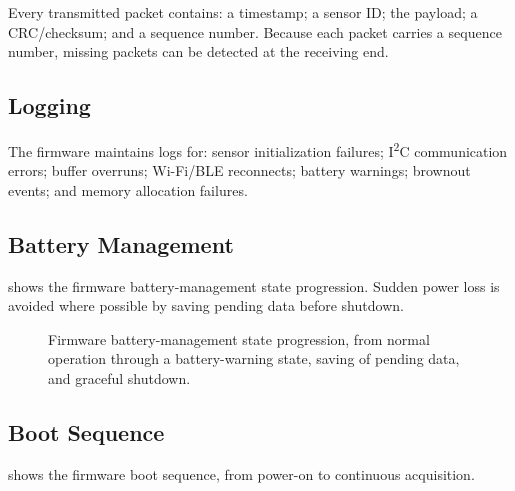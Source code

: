 Every transmitted packet contains: a timestamp; a sensor ID; the payload; a CRC/checksum; and a sequence number. Because each packet carries a sequence number, missing packets can be detected at the receiving end.

\subsection{Logging}
\label{sec:logging-ch6}

The firmware maintains logs for: sensor initialization failures; I\textsuperscript{2}C communication errors; buffer overruns; Wi-Fi/BLE reconnects; battery warnings; brownout events; and memory allocation failures.

\subsection{Battery Management}
\label{sec:battery-management-ch6}

 shows the firmware battery-management state progression. Sudden power loss is avoided where possible by saving pending data before shutdown.

\begin{figure}[H]
\centering
{}
\caption{Firmware battery-management state progression, from normal operation through a battery-warning state, saving of pending data, and graceful shutdown.}
\label{fig:battery-state}
\end{figure}

\subsection{Boot Sequence}
\label{sec:boot-sequence}

 shows the firmware boot sequence, from power-on to continuous acquisition.


